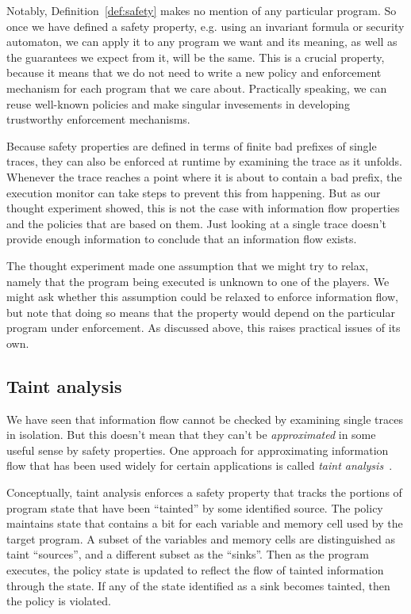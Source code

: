 \documentclass[11pt,twoside]{scrartcl}
\begin{document}
Notably, Definition~\ref{def:safety} makes no mention of any particular program. So once we have defined a safety property, e.g. using an invariant formula or security automaton, we can apply it to any program we want and its meaning, as well as the guarantees we expect from it, will be the same. This is a crucial property, because it means that we do not need to write a new policy and enforcement mechanism for each program that we care about. Practically speaking, we can reuse well-known policies and make singular invesements in developing trustworthy enforcement mechanisms.

Because safety properties are defined in terms of finite bad prefixes of single traces, they can also be enforced at runtime by examining the trace as it unfolds. Whenever the trace reaches a point where it is about to contain a bad prefix, the execution monitor can take steps to prevent this from happening.
But as our thought experiment showed, this is not the case with information flow properties and the policies that are based on them. Just looking at a single trace doesn't provide enough information to conclude that an information flow exists. 

The thought experiment made one assumption that we might try to relax, namely that the program being executed is unknown to one of the players. We might ask whether this assumption could be relaxed to enforce information flow, but note that doing so means that the property would depend on the particular program under enforcement. As discussed above, this raises practical issues of its own.

\subsection{Taint analysis}

We have seen that information flow cannot be checked by examining single traces in isolation. But this doesn't mean that they can't be \emph{approximated} in some useful sense by safety properties. One approach for approximating information flow that has been used widely for certain applications is called \emph{taint analysis}~\cite{Schwartz2010}. 

Conceptually, taint analysis enforces a safety property that tracks the portions of program state that have been ``tainted'' by some identified source. The policy maintains state that contains a bit for each variable and memory cell used by the target program. A subset of the variables and memory cells are distinguished as taint ``sources'', and a different subset as the ``sinks''. Then as the program executes, the policy state is updated to reflect the flow of tainted information through the state. If any of the state identified as a sink becomes tainted, then the policy is violated.
\end{document}
